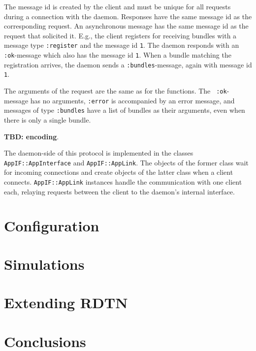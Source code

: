 \documentclass{article}
\begin{document}
The message id is created by the client and must be unique for all requests
during a connection with the daemon. Responses have the same message id as the
corresponding request. An asynchronous message has the same message id as the
request that solicited it. E.g., the client registers for receiving bundles with
a message type {\tt :register} and the message id {\tt 1}. The daemon responds
with an {\tt :ok}-message which also has the message id {\tt 1}. When a bundle
matching the registration arrives, the daemon sends a {\tt :bundles}-message,
again with message id {\tt 1}.

The arguments of the request are the same as for the functions. The {\tt
:ok}-message has no arguments, {\tt :error} is accompanied by an error message,
and messages of type {\tt :bundles} have a list of bundles as their arguments,
even when there is only a single bundle.

{\bf TBD: encoding}.

The daemon-side of this protocol is implemented in the classes {\tt
AppIF::AppInterface} and {\tt AppIF::AppLink}. The objects of the former class
wait for incoming connections and create objects of the latter class when a
client connects. {\tt AppIF::AppLink} instances handle the communication with
one client each, relaying requests between the client to the daemon's internal
interface.

\section{Configuration}\label{sec.config}

\section{Simulations}\label{sec.sim}

\section{Extending RDTN}\label{sec.extending}

\section{Conclusions}\label{sec.conclusions}

%
\end{document}
